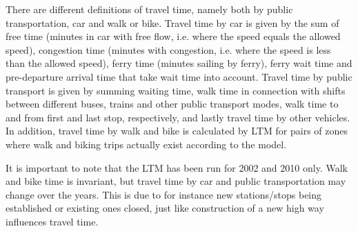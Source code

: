 There are different definitions of travel time, namely both by public transportation, car and walk or bike. Travel time by car is given by the sum of free time (minutes in car with free flow, i.e. where the speed equals the allowed speed), congestion time (minutes with congestion, i.e. where the speed is less than the allowed speed), ferry time (minutes sailing by ferry), ferry wait time and pre-departure arrival time that take wait time into account. Travel time by public transport is given by summing waiting time, walk time in connection with shifts between different buses, trains and other public transport modes, walk time to and from first and last stop, respectively, and lastly travel time by other vehicles. In addition, travel time by walk and bike is calculated by LTM for pairs of zones where walk and biking trips actually exist according to the model. 

It is important to note that the LTM has been run for 2002 and 2010 only. Walk and bike time is invariant, but travel time by car and public transportation may change over the years. This is due to for instance new stations/stops being established or existing ones closed, just like construction of a new high way influences travel time. 


